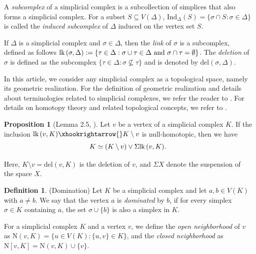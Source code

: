 \documentclass{amsart}
\theoremstyle{definition}
\newtheorem{definition}[theorem]{Definition}
\newtheorem{proposition}[theorem]{Proposition}
\theoremstyle{remark}
\numberwithin{equation}{section}
\newcommand{\lk}{\mbox{\upshape lk}\,}
\newcommand{\D}{\Delta}
\def\n{{\mathrm{N}}}
\begin{document}
A {\em subcomplex} of a simplicial complex is a subcollection of simplices that also forms a simplicial complex. For a subset  $S\subseteq V(\D)$, $\mathrm{Ind}_{\D}(S)=\{\sigma  \cap S : \sigma \in \D\}$ is called the {\em induced subcomplex} of $\D$ induced on the vertex set $S$.



If $\Delta$ is a simplicial complex and $\sigma \in \Delta$, then the {\em link}  of $\sigma$ is a subcomplex, defined as follows
$\lk(\sigma,\D) := \{\tau \in \Delta : \sigma \cup \tau \in \Delta \text{ and } \sigma \cap \tau = \emptyset\}$. The {\em deletion} of $\sigma$ is defined as the subcomplex  $\{\tau\in\Delta : \sigma\nsubseteq\tau\}$ and is denoted by $\text{del}(\sigma,\D)$.

In this article,  we consider any simplicial complex as a topological space, namely its geometric realization. For the definition of
geometric realization and details about terminologies related to simplicial complexes, we refer the reader to \cite{Kozlovbook}. For details on homotopy theory and related topological concepts,  we refer to \cite{Hatcher02}. 



\begin{proposition}[{\rm Lemma 2.5, \cite{HenryShuklaAnurag2025}}]\label{Link and Deletion} 
    Let $v$ be a vertex of a simplicial complex $K$. If the inclusion $\lk(v,K) \xhookrightarrow {} K \setminus v$ is null-homotopic, then we have
    $$K\simeq (K \setminus v) \vee \Sigma \lk(v,K).$$

    Here, $K \setminus v = \text{del}(v,K)$  is the deletion of $v$, and $\Sigma X$ denote the suspension of the space $X$.
\end{proposition}


 



\begin{definition}(Domination)\label{def:domination}
	\rm{   Let $K$ be a simplicial complex and let $a, b \in V(K)$ with $a \neq b$. We say that the vertex $a$ is {\it dominated} by $b$, if for every simplex $\sigma \in K$ containing $a$, the set $\sigma \cup \{b\}$ is also a simplex in $K$. }
    \end{definition} 


For a simplicial complex $K$  and a vertex $v$, we define the {\it open neighborhood} of $v$ as $\n(v, K)=\{u\in V(K): \{u,v\}\in K\}$, and the {\it closed neighborhood} as $\n[v, K]=\n(v, K)\cup\{v\}$.
    
\end{document}
